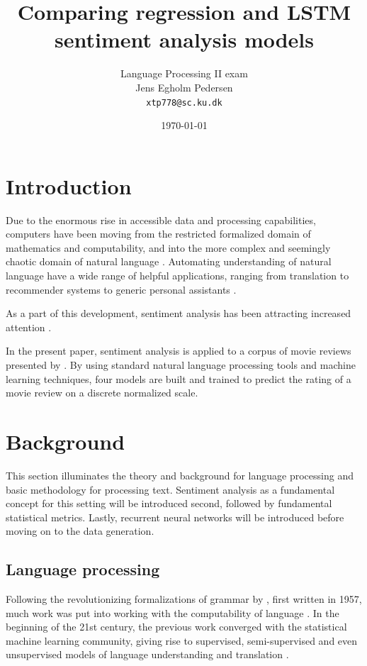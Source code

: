 \documentclass[a4paper]{article}
\title{Comparing regression and LSTM sentiment analysis models}
\author{Language Processing II exam \\ Jens Egholm Pedersen \\ \texttt{xtp778@sc.ku.dk}}
\date{\today}
\begin{document}
\begin{titlepage}
\maketitle

\tableofcontents
\end{titlepage}

\pagebreak

\section{Introduction}
\label{sec:introduction}
Due to the enormous rise in accessible data and processing capabilities,
computers have been moving from the restricted formalized domain of
mathematics and computability, and into the more complex and seemingly
chaotic domain of natural language \citep{NILSSON2009, Jurafsky2000}. Automating
understanding of natural language have a wide range of helpful applications,
ranging from translation to recommender systems to generic personal assistants
\citep{COX2005, BKL2009}.

As a part of this development, sentiment analysis has been attracting increased
attention \citep{BKL2009, Jurafsky2000}. 

In the present paper, sentiment
analysis is applied to a corpus of movie reviews presented by \cite{PangLee2005}.
By using standard natural
language processing tools and machine learning techniques, four models are built
and trained to predict the rating of a movie review on a discrete normalized scale.

\section{Background}
This section illuminates the theory and background for language processing
and basic methodology for processing text.
Sentiment analysis as a fundamental concept for this setting will be introduced
second, followed by fundamental statistical metrics. Lastly,
recurrent neural networks will be introduced before moving on to the data
generation.

\subsection{Language processing}
Following the revolutionizing formalizations of grammar by \cite{Chomsky2002},
first written in 1957, much work was put into working with the computability
of language \citep{Jurafsky2000}. In the beginning of the 21st century,
the previous work converged with the statistical machine learning community,
giving rise to supervised, semi-supervised and even unsupervised models
of language understanding and translation \citep{Jurafsky2000}.
\end{document}
